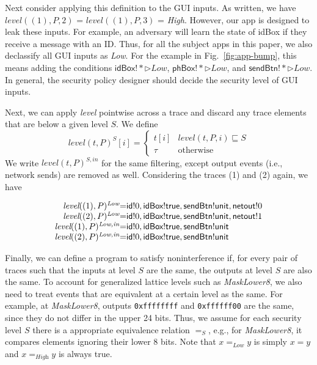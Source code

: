 \documentclass{llncs}
\newcommand{\code}[1]{\textsf{#1}} \newcommand{\bcode}[1]{\texttt{#1}}
\newcommand{\tr}{t\xspace}
\newcommand{\tlevel}[3]{\textit{level}(#1, #2, #3)}
\newcommand{\tleveltr}[2]{\textit{level}(#1, #2)}
\begin{document}
Next consider applying this definition to the GUI inputs. As written,
we have $\tlevel{(1)}{P}{2}$ = $\tlevel{(1)}{P}{3}$ =
\textit{High}. However, our app is designed to leak these inputs. 
For example, an adversary will learn the state of
\code{idBox} if they receive a message with an ID. Thus,
for all the subject apps in this paper, we also declassify all GUI inputs as
\textit{Low}. 
For the example in Fig.~\ref{fig:app-bump}, this means
adding the conditions
$\code{idBox!}\ast \rhd \textit{Low}$,
$\code{phBox!}\ast \rhd \textit{Low}$, and
$\code{sendBtn!}\ast \rhd \textit{Low}$. In general, 
the security policy designer should decide the security level of GUI inputs.

Next, we can apply \textit{level} pointwise across a trace and discard
any trace elements that are below a given level $S$. We define
\begin{displaymath}
\tleveltr{\tr}{P}^S[i] =
\begin{cases}
\tr[i] & \tlevel{\tr}{P}{i} \sqsubseteq S \\
\tau & \textrm{otherwise}
\end{cases}
\end{displaymath}
We write $\tleveltr{\tr}{P}^{S,in}$ for the same filtering, except
output events (i.e., network sends) are removed as well.
Considering the traces (1) and (2) again, we have

\begin{displaymath}
  \begin{array}{r@{ }c@{ }l}
    \tleveltr{(1)}{P}^\textit{Low} & = & \code{id}!0, \code{idBox}!\code{true},
    \code{sendBtn}!\code{unit}, \code{netout}!0 \\
    \tleveltr{(2)}{P}^\textit{Low} & = & \code{id}!0, \code{idBox}!\code{true},
    \code{sendBtn}!\code{unit}, \code{netout}!1 \\
    \tleveltr{(1)}{P}^\textit{Low,in} & = & \code{id}!0, \code{idBox}!\code{true},
    \code{sendBtn}!\code{unit} \\
    \tleveltr{(2)}{P}^\textit{Low,in} & = & \code{id}!0, \code{idBox}!\code{true},
    \code{sendBtn}!\code{unit} \\
  \end{array}
\end{displaymath}

Finally, we can define a program to satisfy noninterference if, for
every pair of traces such that the inputs at level $S$ are the same,
the outputs at level $S$ are also the same.
To account for generalized lattice levels such as \textit{MaskLower8},
we also need to treat events that are equivalent at a certain level as
the same. For example, at \textit{MaskLower8}, outputs
\bcode{0xffffffff} and \bcode{0xffffff00} are the same, since they do
not differ in the upper 24 bits. Thus, we assume for each security
level $S$ there is a appropriate equivalence relation $=_S$, e.g., for
\textit{MaskLower8}, it compares elements ignoring their lower 8
bits. Note that $x =_\textit{Low} y$ is simply $x = y$ and
$x =_\textit{High} y$ is always true.
\end{document}
